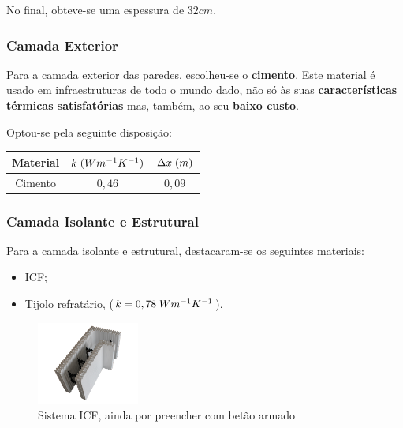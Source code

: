 \documentclass[12pt, a4paper]{article}
\begin{document}
No final, obteve-se uma espessura de $32cm$.

\subsubsection{Camada Exterior}\label{sec:pext_ce}

Para a camada exterior das paredes, escolheu-se o \textbf{cimento}. Este material é usado em infraestruturas de todo o mundo
dado, não só às suas \textbf{características térmicas satisfatórias} mas, também, ao seu \textbf{baixo custo}.

Optou-se pela seguinte disposição:

\begin{center}
	\begin{tabular}{||c c c||}
		\hline
		Material & $k \hspace{1mm} (Wm^{-1}K^{-1})$ & $\Delta x \hspace{1mm} (m)$ \\ [0.5ex]
		\hline\hline
		Cimento  & $0,46$                           & $0,09$                      \\
		\hline
	\end{tabular}
\end{center}

\subsubsection{Camada Isolante e Estrutural}\label{sec:pext_cie}

Para a camada isolante e estrutural, destacaram-se os seguintes materiais:

\begin{center}
	\begin{itemize}
		\item ICF;
		\item Tijolo refratário, ($k=0,78 \hspace{1mm} Wm^{-1}K^{-1}$).
	\end{itemize}
\end{center}

\begin{figure}[htpb]
	\centering
	\includegraphics[width=0.3\textwidth]{icf-exemplo.png}
	
	\caption{Sistema ICF, ainda por preencher com betão armado}\label{fig:icf1}
\end{figure}
\end{document}
